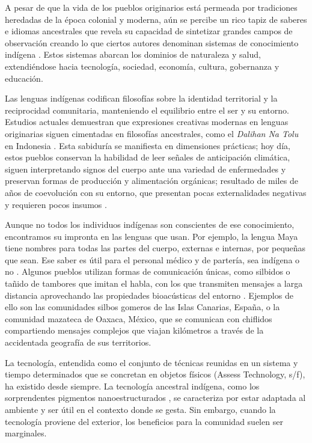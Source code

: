 \documentclass[spanish]{textolivre}
\begin{document}
A pesar de que la vida de los pueblos originarios está permeada por tradiciones heredadas de la época colonial y moderna, aún se percibe un rico tapiz de saberes e idiomas ancestrales \cite{Mager2018,Makgopa2022} que revela su capacidad de sintetizar grandes campos de observación creando lo que ciertos autores denominan sistemas de conocimiento indígena \cite{Ajani2024,IbanezBlancas2020}. Estos sistemas abarcan los dominios de naturaleza y salud, extendiéndose hacia tecnología, sociedad, economía, cultura, gobernanza y educación.

Las lenguas indígenas codifican filosofías sobre la identidad territorial y la reciprocidad comunitaria, manteniendo el equilibrio entre el ser y su entorno. Estudios actuales demuestran que expresiones creativas modernas en lenguas originarias siguen cimentadas en filosofías ancestrales, como el \textit{Dalihan Na Tolu} en Indonesia \cite{Pasaribu2026}. Esta sabiduría se manifiesta en dimensiones prácticas; hoy día, estos pueblos conservan la habilidad de leer señales de anticipación climática, siguen interpretando signos del cuerpo ante una variedad de enfermedades y preservan formas de producción y alimentación orgánicas; resultado de miles de años de coevolución con su entorno, que presentan pocas externalidades negativas y requieren pocos insumos \cite{DeanceBravoTroncoso2017,Valladolid2007}.

Aunque no todos los individuos indígenas son conscientes de ese conocimiento, encontramos su impronta en las lenguas que usan. Por ejemplo, la lengua Maya tiene nombres para todas las partes del cuerpo, externas e internas, por pequeñas que sean. Ese saber es útil para el personal médico y de partería, sea indígena o no \cite{Janetsky2022,MartinBriceno2013}. Algunos pueblos utilizan formas de comunicación únicas, como silbidos o tañido de tambores que imitan el habla, con los que transmiten mensajes a larga distancia aprovechando las propiedades bioacústicas del entorno \cite{Meyer2012}. Ejemplos de ello son las comunidades silbos gomeros de las Islas Canarias, España, o la comunidad mazateca de Oaxaca, México, que se comunican con chiflidos compartiendo mensajes complejos que viajan kilómetros a través de la accidentada geografía de sus territorios.

La tecnología, entendida como el conjunto de técnicas reunidas en un sistema y tiempo determinados que se concretan en objetos físicos (Assess Technology, s/f), ha existido desde siempre. La tecnología ancestral indígena, como los sorprendentes pigmentos nanoestructurados \cite{FernandezSabido2012,Yacaman1996}, se caracteriza por estar adaptada al ambiente y ser útil en el contexto donde se gesta. Sin embargo, cuando la tecnología proviene del exterior, los beneficios para la comunidad suelen ser marginales.
\end{document}
